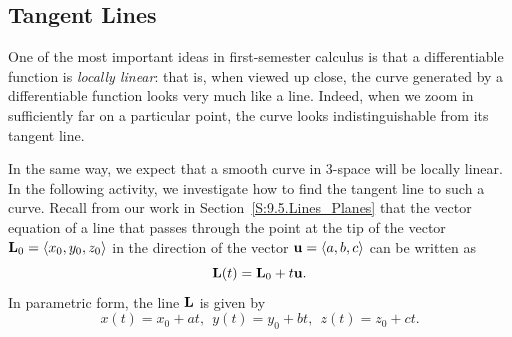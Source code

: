 
%

\subsection*{Tangent Lines}

One of the most important ideas in first-semester calculus is that a
differentiable function is \emph{locally linear}: that is, when viewed
up close, the curve generated by a differentiable function looks very
much like a line.  Indeed, when we zoom in sufficiently far on a
particular point, the curve looks indistinguishable from its tangent
line.

In the same way, we expect that a smooth curve in 3-space will be
locally linear.  In the following activity, we investigate how to find
the tangent line to such a curve.  Recall from our work in
Section~\ref{S:9.5.Lines_Planes} that the vector equation of a line that
passes through the point at the tip of the vector $\mathbf{L}_0 = \langle
x_0, y_0, z_0 \rangle$ in the direction of the vector $\mathbf{u} = \langle
a, b, c \rangle$ can be written as
$$\mathbf{L}(t) = \mathbf{L}_0 + t \mathbf{u}.$$
In parametric form, the line $\mathbf{L}$ is given by
$$x(t) = x_0 + at, \ \ y(t) = y_0 + bt, \ \ z(t) = z_0 + ct.$$

